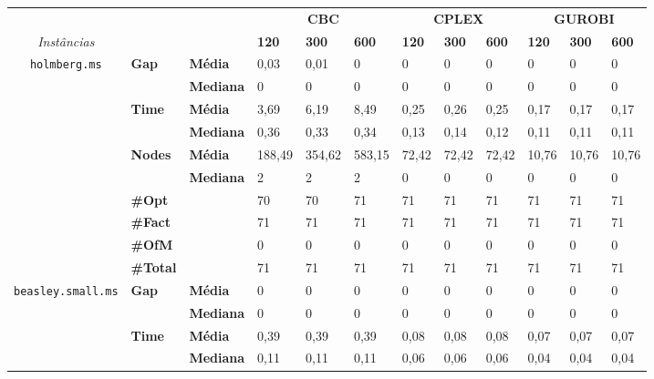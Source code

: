 \documentclass[]{article}
\begin{document}
	
	\begin{table}[]
		\begin{adjustbox}{angle=90}
			\begin{tabular}{cll|lll|lll|lll}
				& & & \multicolumn{3}{c}{\textbf{CBC}} & \multicolumn{3}{c}{\textbf{CPLEX}} & \multicolumn{3}{c}{\textbf{GUROBI}} 	\\\textit{Instâncias} & & & \textbf{120} & \textbf{300} & \textbf{600} & \textbf{120} & \textbf{300} & \textbf{600} & \textbf{120} & \textbf{300} & \textbf{600} \\
				\hline
				\multirow{7}{*}{\texttt{holmberg.ms}} & \multirow{2}{*}{\textbf{Gap}} & \textbf{Média} & 0,03 & 0,01 & 0 & 0 & 0 & 0 & 0 & 0 & 0 \\
				& & \textbf{Mediana} & 0 & 0 & 0 & 0 & 0 & 0 & 0 & 0 & 0 \\
				\cline{2-12}
				& \multirow{2}{*}{\textbf{Time}} & \textbf{Média} & 3,69 & 6,19 & 8,49 & 0,25 & 0,26 & 0,25 & 0,17 & 0,17 & 0,17 \\
				& & \textbf{Mediana} & 0,36 & 0,33 & 0,34 & 0,13 & 0,14 & 0,12 & 0,11 & 0,11 & 0,11 \\
				\cline{2-12}
				& \multirow{2}{*}{\textbf{Nodes}} & \textbf{Média} & 188,49 & 354,62 & 583,15 & 72,42 & 72,42 & 72,42 & 10,76 & 10,76 & 10,76 \\
				& & \textbf{Mediana} & 2 & 2 & 2 & 0 & 0 & 0 & 0 & 0 & 0 \\
				\cline{2-12}
				& \textbf{\#Opt} & & 70 & 70 & 71 & 71 & 71 & 71 & 71 & 71 & 71 \\
				& \textbf{\#Fact} & & 71 & 71 & 71 & 71 & 71 & 71 & 71 & 71 & 71 \\
				& \textbf{\#OfM} & & 0 & 0 & 0 & 0 & 0 & 0 & 0 & 0 & 0 \\
				& \textbf{\#Total} & & 71 & 71 & 71 & 71 & 71 & 71 & 71 & 71 & 71 \\
				\hline
				\multirow{7}{*}{\texttt{beasley.small.ms}} & \multirow{2}{*}{\textbf{Gap}} & \textbf{Média} & 0 & 0 & 0 & 0 & 0 & 0 & 0 & 0 & 0 \\
				& & \textbf{Mediana} & 0 & 0 & 0 & 0 & 0 & 0 & 0 & 0 & 0 \\
				\cline{2-12}
				& \multirow{2}{*}{\textbf{Time}} & \textbf{Média} & 0,39 & 0,39 & 0,39 & 0,08 & 0,08 & 0,08 & 0,07 & 0,07 & 0,07 \\
				& & \textbf{Mediana} & 0,11 & 0,11 & 0,11 & 0,06 & 0,06 & 0,06 & 0,04 & 0,04 & 0,04 \\

\end{tabular}
\end{adjustbox}
\end{table}
\end{document}
